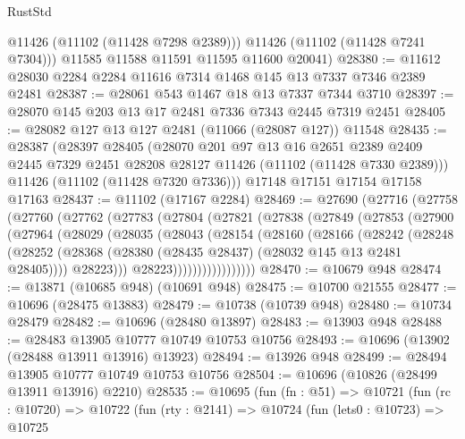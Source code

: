 \begin{lexlean}{RustStd}
\begin{coremodule}
          @11426
          (@11102 (@11428 @7298 @2389)))
        @11426
        (@11102 (@11428 @7241 @7304)))
      @11585
      @11588
      @11591
      @11595
      @11600
      @20041)
@28380 := @11612 @28030 @2284 @2284 @11616 @7314 @1468 @145 @13 @7337 @7346 @2389 @2481
@28387 := @28061 @543 @1467 @18 @13 @7337 @7344 @3710
@28397 := @28070 @145 @203 @13 @17 @2481 @7336 @7343 @2445 @7319 @2451
@28405 := @28082 @127 @13 @127 @2481 (@11066 (@28087 @127)) @11548
@28435 := @28387
    (@28397
      @28405
      (@28070
        @201
        @97
        @13
        @16
        @2651
        @2389
        @2409
        @2445
        @7329
        @2451
        @28208
        @28127
        @11426
        (@11102 (@11428 @7330 @2389)))
      @11426
      (@11102 (@11428 @7320 @7336)))
    @17148
    @17151
    @17154
    @17158
    @17163
@28437 := @11102 (@17167 @2284)
@28469 := @27690
    (@27716
      (@27758
        (@27760
          (@27762
            (@27783
              (@27804
                (@27821
                  (@27838
                    (@27849
                      (@27853
                        (@27900
                          (@27964
                            (@28029
                              (@28035
                                (@28043
                                  (@28154
                                    (@28160
                                      (@28166
                                        (@28242
                                          (@28248
                                            (@28252
                                              (@28368
                                                (@28380
                                                  (@28435 @28437)
                                                  (@28032 @145 @13 @2481 @28405))))
                                            @28223)))
                                      @28223)))))))))))))))))
@28470 := @10679 @948
@28474 := @13871 (@10685 @948) (@10691 @948)
@28475 := @10700 @21555
@28477 := @10696 (@28475 @13883)
@28479 := @10738 (@10739 @948)
@28480 := @10734 @28479
@28482 := @10696 (@28480 @13897)
@28483 := @13903 @948
@28488 := @28483 @13905 @10777 @10749 @10753 @10756
@28493 := @10696 (@13902 (@28488 @13911 @13916) @13923)
@28494 := @13926 @948
@28499 := @28494 @13905 @10777 @10749 @10753 @10756
@28504 := @10696 (@10826 (@28499 @13911 @13916) @2210)
@28535 := @10695
    (fun (fn : @51) =>
    @10721
      (fun (rc : @10720) =>
      @10722
        (fun (rty : @2141) =>
        @10724
          (fun (lets0 : @10723) =>
          @10725

\end{coremodule}
\end{lexlean}
